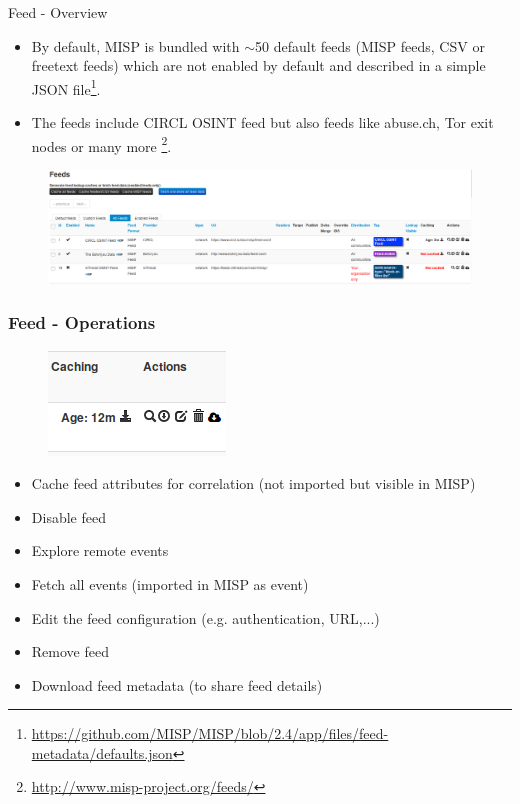 \begin{frame}{Feed - Overview}
        \begin{itemize}
        \item By default, MISP is bundled with $\sim$50 default feeds (MISP feeds, CSV or freetext feeds) which are not enabled by default and described in a simple JSON file\footnote{\url{https://github.com/MISP/MISP/blob/2.4/app/files/feed-metadata/defaults.json}}.
        \item The feeds include CIRCL OSINT feed but also feeds like abuse.ch, Tor exit nodes or many more \footnote{\url{http://www.misp-project.org/feeds/}}.
        \end{itemize}
    \vspace{-25px}
    \begin{figure}
        \includegraphics[width=1.05\linewidth]{pics/feeds1.png}
    \end{figure}
\end{frame}

\begin{frame}
    \frametitle{Feed - Operations}
    \begin{figure}
        \includegraphics[width=0.35\linewidth]{pics/feeds2.png}
    \end{figure}
    \begin{itemize}
        \item Cache feed attributes for correlation (not imported but visible in MISP)
        \item Disable feed
        \item Explore remote events
        \item Fetch all events (imported in MISP as event)
        \item Edit the feed configuration (e.g. authentication, URL,...)
        \item Remove feed
        \item Download feed metadata (to share feed details)
    \end{itemize}
\end{frame}

